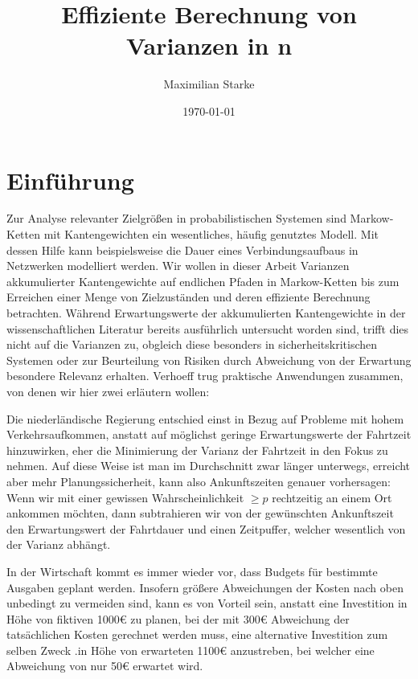 \documentclass[a4paper]{article}
\title{Effiziente Berechnung von Varianzen in \mc{}n}%
\author{Maximilian Starke}
\affil{Fakultät für Informatik, Technische Universität Dresden}
\date{\today}
\newcommand{\mc}{Markow-Kette}
\theoremstyle{nonumberplain}
\begin{document}
	
	\maketitle
	\vspace{3em}
	\tableofcontents
	\pagebreak
	
	\section{Einführung}
	
	Zur Analyse relevanter Zielgrößen in probabilistischen Systemen sind \mc{}n mit Kantengewichten ein wesentliches, häufig genutztes Modell. Mit dessen Hilfe kann beispielsweise die Dauer eines Verbindungsaufbaus in Netzwerken modelliert werden. Wir wollen in dieser Arbeit Varianzen akkumulierter Kantengewichte auf endlichen Pfaden in \mc{}n bis zum Erreichen einer Menge von Zielzuständen und deren effiziente Berechnung betrachten.
	Während Erwartungswerte der akkumulierten Kantengewichte in der wissenschaftlichen Literatur bereits ausführlich untersucht worden sind, trifft dies nicht auf die Varianzen zu, obgleich diese besonders in sicherheitskritischen Systemen oder zur Beurteilung von Risiken durch Abweichung von der Erwartung besondere Relevanz erhalten.
	Verhoeff \cite{Verh04} trug praktische Anwendungen zusammen, von denen wir hier zwei erläutern wollen:
	
	Die niederländische Regierung entschied einst in Bezug auf Probleme mit hohem Verkehrsaufkommen, anstatt auf möglichst geringe Erwartungswerte der Fahrtzeit hinzuwirken, eher die Minimierung der Varianz der Fahrtzeit in den Fokus zu nehmen. Auf diese Weise ist man im Durchschnitt zwar länger unterwegs, erreicht aber mehr Planungssicherheit, kann also Ankunftszeiten genauer vorhersagen:
	Wenn wir mit einer gewissen Wahrscheinlichkeit $\geq p$ rechtzeitig an einem Ort ankommen möchten, dann subtrahieren wir von der gewünschten Ankunftszeit den Erwartungswert der Fahrtdauer und einen Zeitpuffer, welcher wesentlich von der Varianz abhängt.
	
	In der Wirtschaft kommt es immer wieder vor, dass Budgets für bestimmte Ausgaben geplant werden. Insofern größere Abweichungen der Kosten nach oben unbedingt zu vermeiden sind, kann es von Vorteil sein, anstatt eine Investition in Höhe von fiktiven 1000\euro{} zu planen, bei der mit 300\euro{} Abweichung der tatsächlichen Kosten gerechnet werden muss, eine alternative Investition zum selben Zweck .in Höhe von erwarteten 1100\euro{} anzustreben, bei welcher eine Abweichung von nur 50\euro{} erwartet wird.
	
\end{document}
